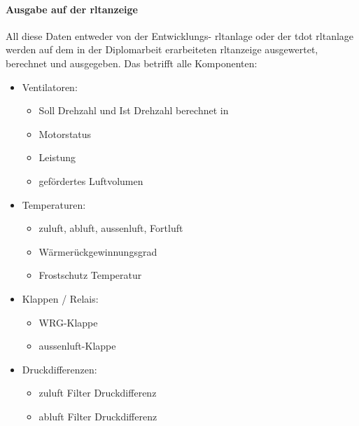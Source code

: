 \paragraph{Ausgabe auf der \ac{rltanzeige}}
All diese Daten entweder von der Entwicklungs- \ac{rltanlage} oder der \gls{tdot} \ac{rltanlage} werden auf dem in der Diplomarbeit erarbeiteten \ac{rltanzeige} ausgewertet, berechnet und ausgegeben. 
Das betrifft alle Komponenten:
\begin{itemize}

	\item Ventilatoren: 
	\begin{itemize}
		\item Soll Drehzahl und Ist Drehzahl berechnet in %
		\item Motorstatus
		\item Leistung 
		\item gefördertes Luftvolumen
	\end{itemize}

	\item Temperaturen:
	\begin{itemize}
		\item \gls{zuluft}, \gls{abluft}, \gls{aussenluft}, Fortluft
		\item Wärmerückgewinnungsgrad
		\item Frostschutz Temperatur 
	\end{itemize}

	\item Klappen / Relais:
	\begin{itemize}
		\item WRG-Klappe
		\item \gls{aussenluft}-Klappe 
	\end{itemize}
	
	\item Druckdifferenzen:
	\begin{itemize}
		\item \gls{zuluft} Filter Druckdifferenz
		\item \gls{abluft} Filter Druckdifferenz
	\end{itemize}
\end{itemize}

